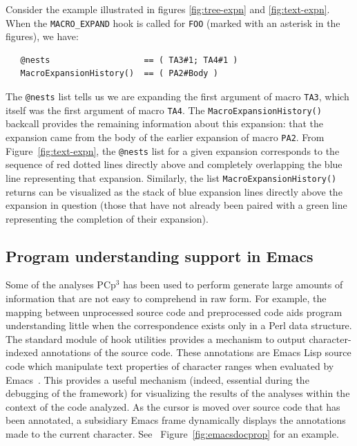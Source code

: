 \documentclass{article}
\newcommand{\pcp}{\mbox{\textsf{PCp}$^3$}}
\newcommand{\Perl}{\mbox{Perl}}
\newcommand{\figref}[1]{Figure~\ref{#1}}
\begin{document}
Consider the example illustrated in figures \ref{fig:tree-expn} and
\ref{fig:text-expn}.  When the \texttt{MACRO\_EXPAND} hook is called for
\texttt{FOO} (marked with an asterisk in the figures), we have:

\begin{verbatim}
   @nests                   == ( TA3#1; TA4#1 )
   MacroExpansionHistory()  == ( PA2#Body )
\end{verbatim}

\noindent The \texttt{@nests} list tells us we are expanding the first
argument of macro \texttt{TA3}, which itself was the first argument of
macro \texttt{TA4}.  The \texttt{MacroExpansionHistory()} backcall
provides the remaining information about this expansion: that the
expansion came from the body of the earlier expansion of macro
\texttt{PA2}.  From \figref{fig:text-expn}, the \texttt{@nests} list
for a given expansion corresponds to the sequence of red dotted lines
directly above and completely overlapping the blue line representing
that expansion.  Similarly, the list \texttt{MacroExpansionHistory()}
returns can be visualized as the stack of blue expansion
lines directly above the expansion in question (those that have not
already been paired with a green line representing the completion of
their expansion).

\subsection{Program understanding support in Emacs}
Some of the analyses \pcp{} has been used to perform generate large amounts of
information that are not easy to comprehend in raw form.  For example,
the mapping between unprocessed source code and preprocessed code aids
program understanding little when the correspondence exists only in a
\Perl{} data structure.
The standard module of hook utilities provides a
mechanism to output character-indexed annotations of the source code.
These annotations are Emacs Lisp source code which manipulate text
properties of character ranges when evaluated by Emacs~\cite{GNUELisp}.  This
provides a useful mechanism (indeed, essential during the debugging of
the framework) for visualizing the results of the analyses within the
context of the code analyzed.  As the cursor is moved over source code
that has been annotated, a subsidiary Emacs frame dynamically displays
the annotations made to the current character. See
~\figref{fig:emacsdocprop} for an example.
\end{document}

